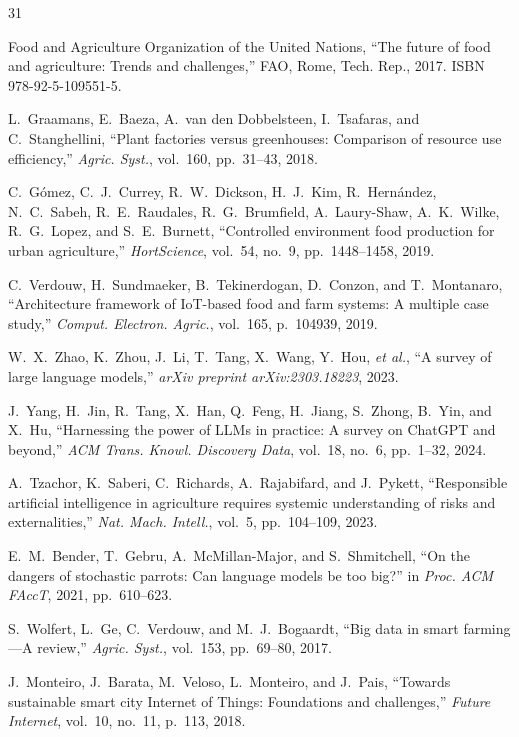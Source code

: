 \documentclass[journal,10pt,twocolumn]{IEEEtran}
\begin{document}
\begin{thebibliography}{31}

{Food and Agriculture Organization of the United Nations},
``The future of food and agriculture: Trends and challenges,''
FAO, Rome, Tech. Rep., 2017.
ISBN 978-92-5-109551-5.

L.~Graamans, E.~Baeza, A.~van den Dobbelsteen, I.~Tsafaras, and
C.~Stanghellini,
``Plant factories versus greenhouses: Comparison of resource use
efficiency,''
\emph{Agric. Syst.}, vol.~160, pp.~31--43, 2018.

C.~Gómez, C.~J.~Currey, R.~W.~Dickson, H.~J.~Kim,
R.~Hernández, N.~C.~Sabeh, R.~E.~Raudales, R.~G.~Brumfield,
A.~Laury-Shaw, A.~K.~Wilke, R.~G.~Lopez, and S.~E.~Burnett,
``Controlled environment food production for urban agriculture,''
\emph{HortScience}, vol.~54, no.~9, pp.~1448--1458, 2019.

C.~Verdouw, H.~Sundmaeker, B.~Tekinerdogan, D.~Conzon, and
T.~Montanaro,
``Architecture framework of IoT-based food and farm systems:
A multiple case study,''
\emph{Comput. Electron. Agric.}, vol.~165, p.~104939, 2019.

W.~X.~Zhao, K.~Zhou, J.~Li, T.~Tang, X.~Wang, Y.~Hou,
\emph{et al.},
``A survey of large language models,''
\emph{arXiv preprint arXiv:2303.18223}, 2023.

J.~Yang, H.~Jin, R.~Tang, X.~Han, Q.~Feng, H.~Jiang,
S.~Zhong, B.~Yin, and X.~Hu,
``Harnessing the power of LLMs in practice: A survey on
ChatGPT and beyond,''
\emph{ACM Trans. Knowl. Discovery Data}, vol.~18, no.~6,
pp.~1--32, 2024.

A.~Tzachor, K.~Saberi, C.~Richards, A.~Rajabifard, and
J.~Pykett,
``Responsible artificial intelligence in agriculture requires
systemic understanding of risks and externalities,''
\emph{Nat. Mach. Intell.}, vol.~5, pp.~104--109, 2023.

E.~M.~Bender, T.~Gebru, A.~McMillan-Major, and S.~Shmitchell,
``On the dangers of stochastic parrots: Can language models be
too big?''
in \emph{Proc. ACM FAccT}, 2021, pp.~610--623.

S.~Wolfert, L.~Ge, C.~Verdouw, and M.~J.~Bogaardt,
``Big data in smart farming---A review,''
\emph{Agric. Syst.}, vol.~153, pp.~69--80, 2017.

J.~Monteiro, J.~Barata, M.~Veloso, L.~Monteiro, and J.~Pais,
``Towards sustainable smart city Internet of Things:
Foundations and challenges,''
\emph{Future Internet}, vol.~10, no.~11, p.~113, 2018.


\end{thebibliography}
\end{document}
